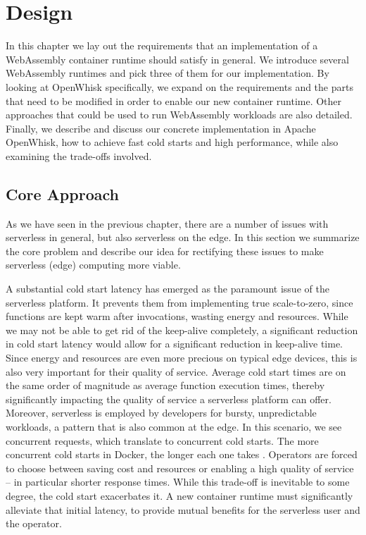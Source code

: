 \chapter{Design}
\label{chapter:design}

In this chapter we lay out the requirements that an implementation of a WebAssembly container runtime should satisfy in general. We introduce several WebAssembly runtimes and pick three of them for our implementation.
By looking at OpenWhisk specifically, we expand on the requirements and the parts that need to be modified in order to enable our new container runtime. Other approaches that could be used to run WebAssembly workloads are also detailed. Finally, we describe and discuss our concrete implementation in Apache OpenWhisk, how to achieve fast cold starts and high performance, while also examining the trade-offs involved.

\section{Core Approach}

As we have seen in the previous chapter, there are a number of issues with serverless in general, but also serverless on the edge. In this section we summarize the core problem and describe our idea for rectifying these issues to make serverless (edge) computing more viable.

A substantial cold start latency has emerged as the paramount issue of the serverless platform. It prevents them from implementing true scale-to-zero, since functions are kept warm after invocations, wasting energy and resources. While we may not be able to get rid of the keep-alive completely, a significant reduction in cold start latency would allow for a significant reduction in keep-alive time. Since energy and resources are even more precious on typical edge devices, this is also very important for their quality of service.
Average cold start times are on the same order of magnitude as average function execution times, thereby significantly impacting the quality of service a serverless platform can offer. Moreover, serverless is employed by developers for bursty, unpredictable workloads, a pattern that is also common at the edge. In this scenario, we see concurrent requests, which translate to concurrent cold starts. The more concurrent cold starts in Docker, the longer each one takes \cite{Cui2018}.
Operators are forced to choose between saving cost and resources or enabling a high quality of service -- in particular shorter response times. While this trade-off is inevitable to some degree, the cold start exacerbates it. A new container runtime must significantly alleviate that initial latency, to provide mutual benefits for the serverless user and the operator.

